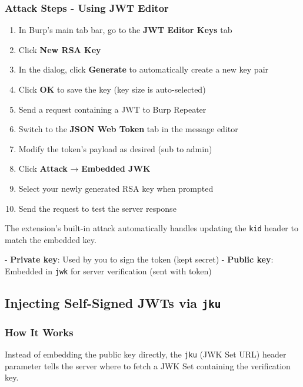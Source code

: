 \documentclass{article}
\begin{document}
\subsubsection{Attack Steps - Using JWT Editor}

\begin{enumerate}
    \item In Burp's main tab bar, go to the \textbf{JWT Editor Keys} tab
    \item Click \textbf{New RSA Key}
    \item In the dialog, click \textbf{Generate} to automatically create a new key pair
    \item Click \textbf{OK} to save the key (key size is auto-selected)
    \item Send a request containing a JWT to Burp Repeater
    \item Switch to the \textbf{JSON Web Token} tab in the message editor
    \item Modify the token's payload as desired (sub to admin)
    \item Click \textbf{Attack} → \textbf{Embedded JWK}
    \item Select your newly generated RSA key when prompted
    \item Send the request to test the server response
\end{enumerate}

\begin{attackbox}
The extension's built-in attack automatically handles updating the \texttt{kid} header to match the embedded key.
\end{attackbox}

\begin{notebox}
- \textbf{Private key}: Used by you to sign the token (kept secret)
- \textbf{Public key}: Embedded in \texttt{jwk} for server verification (sent with token)
\end{notebox}

\subsection{Injecting Self-Signed JWTs via \texttt{jku}}

\subsubsection{How It Works}

Instead of embedding the public key directly, the \texttt{jku} (JWK Set URL) header parameter tells the server where to fetch a JWK Set containing the verification key.
\end{document}
